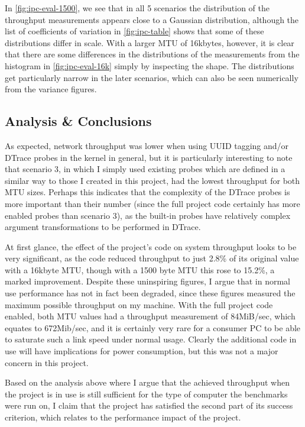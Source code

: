 \documentclass[a4paper,12pt,twoside,openright]{report}
\begin{document}
	In \figurename{ \ref{fig:ipc-eval-1500}}, we see that in all 5 scenarios the distribution of the throughput measurements appears close to a Gaussian distribution, although the list of coefficients of variation in \tablename{ \ref{fig:ipc-table}} shows that some of these distributions differ in scale. With a larger MTU of 16kbytes, however, it is clear that there are some differences in the distributions of the measurements from the histogram in \figurename{ \ref{fig:ipc-eval-16k}} simply by inspecting the shape. The distributions get particularly narrow in the later scenarios, which can also be seen numerically from the variance figures.
	
	\subsection{Analysis \& Conclusions}
	
	As expected, network throughput was lower when using UUID tagging and/or DTrace probes in the kernel in general, but it is particularly interesting to note that scenario 3, in which I simply used existing probes which are defined in a similar way to those I created in this project, had the lowest throughput for both MTU sizes. Perhaps this indicates that the complexity of the DTrace probes is more important than their number (since the full project code certainly has more enabled probes than scenario 3), as the built-in probes have relatively complex argument transformations to be performed in DTrace.
	
	At first glance, the effect of the project's code on system throughput looks to be very significant, as the code reduced throughput to just 2.8\% of its original value with a 16kbyte MTU, though with a 1500 byte MTU this rose to 15.2\%, a marked improvement. Despite these uninspiring figures, I argue that in normal use performance has not in fact been degraded, since these figures measured the maximum possible throughput on my machine. With the full project code enabled, both MTU values had a throughput measurement of 84MiB/sec, which equates to 672Mib/sec, and it is certainly very rare for a consumer PC to be able to saturate such a link speed under normal usage. Clearly the additional code in use will have implications for power consumption, but this was not a major concern in this project.
	
	Based on the analysis above where I argue that the achieved throughput when the project is in use is still sufficient for the type of computer the benchmarks were run on, I claim that the project has satisfied the second part of its success criterion, which relates to the performance impact of the project.
	
\end{document}
